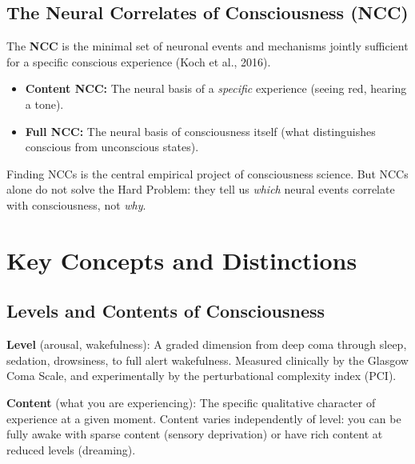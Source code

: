 \documentclass[11pt,a4paper]{report}
\begin{document}
\section{The Neural Correlates of Consciousness (NCC)}

\begin{definitionbox}
The \textbf{NCC} is the minimal set of neuronal events and mechanisms jointly sufficient for a specific conscious experience (Koch et al., 2016).
\begin{itemize}[leftmargin=1.5em]
  \item \textbf{Content NCC:} The neural basis of a \emph{specific} experience (seeing red, hearing a tone).
  \item \textbf{Full NCC:} The neural basis of consciousness itself (what distinguishes conscious from unconscious states).
\end{itemize}
Finding NCCs is the central empirical project of consciousness science. But NCCs alone do not solve the Hard Problem: they tell us \emph{which} neural events correlate with consciousness, not \emph{why}.
\end{definitionbox}


\chapter{Key Concepts and Distinctions}

\section{Levels and Contents of Consciousness}

\begin{principlebox}
\textbf{Level} (arousal, wakefulness): A graded dimension from deep coma through sleep, sedation, drowsiness, to full alert wakefulness. Measured clinically by the Glasgow Coma Scale, and experimentally by the perturbational complexity index (PCI).

\textbf{Content} (what you are experiencing): The specific qualitative character of experience at a given moment. Content varies independently of level: you can be fully awake with sparse content (sensory deprivation) or have rich content at reduced levels (dreaming).
\end{principlebox}
\end{document}
